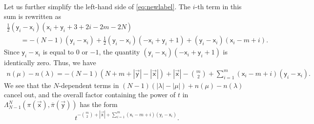 Let us further simplify the left-hand side of
\eqref{eq:newlabel}.
The $i$-th term in this sum
is rewritten as
\begin{gather*}
	\frac12(\mathsf{y}_i-\mathsf{x}_i)(\mathsf{x}_i+\mathsf{y}_i+3+2i-2m-2N)\\
\qquad{}
	=
	-(N-1)(\mathsf{y}_i-\mathsf{x}_i)
	+
	\frac12(\mathsf{y}_i-\mathsf{x}_i)(-\mathsf{x}_i+\mathsf{y}_i+1)
	+
	(\mathsf{y}_i-\mathsf{x}_i)(\mathsf{x}_i-m+i).
\end{gather*}
Since $\mathsf{y}_i-\mathsf{x}_i$ is equal to $0$ or $-1$,
the quantity
$(\mathsf{y}_i-\mathsf{x}_i)(-\mathsf{x}_i+\mathsf{y}_i+1)$
is identically zero.
Thus, we have
\begin{align*}
	n(\mu)-n(\lambda)=
	-(N-1)(N+m+|\vec{\mathsf{y}}|-|\vec{\mathsf{x}}|)
	+|\vec{\mathsf{x}}|-\binom m2
	+\sum_{i=1}^{m}
	(\mathsf{x}_{i}-m+i)(\mathsf{y}_{i}-\mathsf{x}_{i}).
\end{align*}
We see that
the $N$-dependent terms
in
$(N-1)(|\lambda|-|\mu|)+n(\mu)-n(\lambda)$
cancel out, and the overall
factor containing the
power of $t$
in
$\Lambda^{N}_{N-1}(\pi(\vec{\mathsf{x}}),\overline\pi(\vec{\mathsf{y}}))$
has the form
\begin{equation*}%
	t^{-\binom m2+|\vec{\mathsf{x}}|
	+\sum_{i=1}^{m}
	(\mathsf{x}_{i}-m+i)(\mathsf{y}_{i}-\mathsf{x}_{i})}.
\end{equation*}

